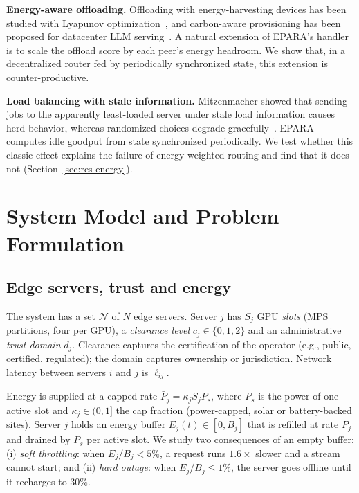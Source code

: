 \documentclass[journal]{IEEEtran}
\begin{document}
\textbf{Energy-aware offloading.}
Offloading with energy-harvesting devices has been studied with Lyapunov optimization~\cite{mao2016harvest}, and carbon-aware provisioning has been proposed for datacenter LLM serving~\cite{ecoserve}. A natural extension of EPARA's handler is to scale the offload score by each peer's energy headroom. We show that, in a decentralized router fed by periodically synchronized state, this extension is counter-productive.

\textbf{Load balancing with stale information.}
Mitzenmacher showed that sending jobs to the apparently least-loaded server under stale load information causes herd behavior, whereas randomized choices degrade gracefully~\cite{mitzenmacher2000old,mitzenmacher2001two}. EPARA computes idle goodput from state synchronized periodically. We test whether this classic effect explains the failure of energy-weighted routing and find that it does not (Section~\ref{sec:res-energy}).

\section{System Model and Problem Formulation}\label{sec:model}

\subsection{Edge servers, trust and energy}
The system has a set $\mathcal{N}$ of $N$ edge servers. Server $j$ has $S_j$ GPU \emph{slots} (MPS partitions, four per GPU), a \emph{clearance level} $c_j\in\{0,1,2\}$ and an administrative \emph{trust domain} $d_j$. Clearance captures the certification of the operator (e.g., public, certified, regulated); the domain captures ownership or jurisdiction. Network latency between servers $i$ and $j$ is $\ell_{ij}$.

Energy is supplied at a capped rate $\bar P_j=\kappa_j S_j P_s$, where $P_s$ is the power of one active slot and $\kappa_j\in(0,1]$ the cap fraction (power-capped, solar or battery-backed sites). Server $j$ holds an energy buffer $E_j(t)\in[0,B_j]$ that is refilled at rate $\bar P_j$ and drained by $P_s$ per active slot. We study two consequences of an empty buffer:
(i) \emph{soft throttling}: when $E_j/B_j<5\%$, a request runs $1.6\times$ slower and a stream cannot start; and
(ii) \emph{hard outage}: when $E_j/B_j\le1\%$, the server goes offline until it recharges to $30\%$.
\end{document}
